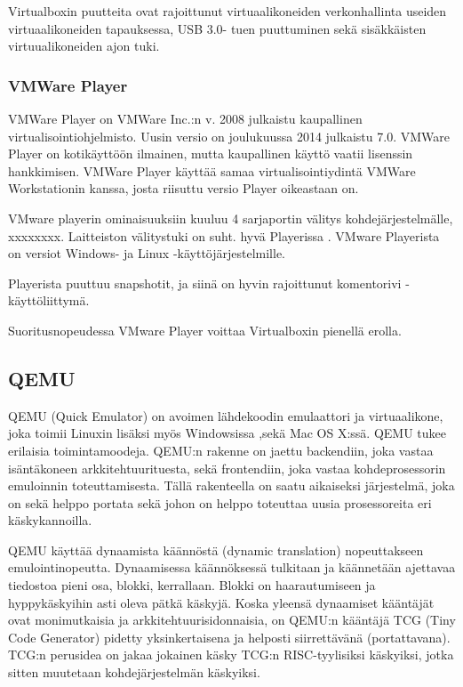Virtualboxin puutteita ovat rajoittunut virtuaalikoneiden verkonhallinta useiden virtuaalikoneiden tapauksessa, USB 3.0- tuen puuttuminen sekä sisäkkäisten virtuualikoneiden ajon tuki.


\subsubsection{VMWare Player}
VMWare Player on VMWare Inc.:n v. 2008 julkaistu kaupallinen virtualisointiohjelmisto. Uusin versio on joulukuussa 2014 julkaistu 7.0. VMWare Player on kotikäyttöön ilmainen, mutta kaupallinen käyttö vaatii lisenssin hankkimisen. VMWare Player käyttää samaa virtualisointiydintä VMWare Workstationin kanssa, josta riisuttu versio Player oikeastaan on.

VMware playerin ominaisuuksiin kuuluu 4 sarjaportin välitys kohdejärjestelmälle, xxxxxxxx. Laitteiston välitystuki on suht. hyvä Playerissa . VMware Playerista on versiot Windows- ja Linux -käyttöjärjestelmille.

Playerista puuttuu snapshotit, ja siinä on hyvin rajoittunut komentorivi -käyttöliittymä.

Suoritusnopeudessa VMware Player voittaa Virtualboxin pienellä erolla.



\subsection{QEMU}
QEMU (Quick Emulator) on avoimen lähdekoodin emulaattori ja virtuaalikone, joka toimii Linuxin lisäksi myös Windowsissa ,sekä Mac OS X:ssä. QEMU tukee erilaisia toimintamoodeja. QEMU:n rakenne on jaettu backendiin, joka vastaa isäntäkoneen arkkitehtuurituesta, sekä frontendiin, joka vastaa kohdeprosessorin emuloinnin toteuttamisesta. Tällä rakenteella on saatu aikaiseksi järjestelmä, joka on sekä helppo portata sekä johon on helppo toteuttaa uusia prosessoreita eri käskykannoilla.

QEMU käyttää dynaamista käännöstä (dynamic translation) nopeuttakseen emulointinopeutta. Dynaamisessa käännöksessä tulkitaan ja käännetään ajettavaa tiedostoa pieni osa, blokki, kerrallaan. Blokki on haarautumiseen ja hyppykäskyihin asti oleva pätkä käskyjä. Koska yleensä dynaamiset kääntäjät ovat monimutkaisia ja arkkitehtuurisidonnaisia, on QEMU:n kääntäjä TCG (Tiny Code Generator) pidetty yksinkertaisena ja helposti siirrettävänä (portattavana). TCG:n perusidea on jakaa jokainen käsky TCG:n RISC-tyylisiksi käskyiksi, jotka sitten muutetaan kohdejärjestelmän käskyiksi.


